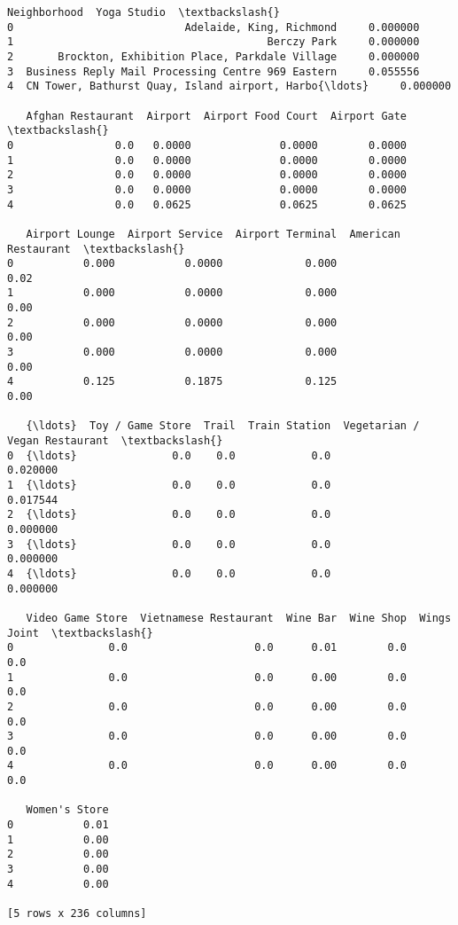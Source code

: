 \documentclass[11pt]{article}
\makeatletter
\newcommand{\boxspacing}{\kern\kvtcb@left@rule\kern\kvtcb@boxsep}
\newcommand{\prompt}[4]{
        \ttfamily\llap{{\color{#2}[#3]:\hspace{3pt}#4}}\vspace{-\baselineskip}
    }
\makeatother
\begin{document}
            \begin{tcolorbox}[breakable, size=fbox, boxrule=.5pt, pad at break*=1mm, opacityfill=0]
\prompt{Out}{outcolor}{40}{\boxspacing}
\begin{Verbatim}[commandchars=\\\{\}]
                                        Neighborhood  Yoga Studio  \textbackslash{}
0                           Adelaide, King, Richmond     0.000000
1                                        Berczy Park     0.000000
2       Brockton, Exhibition Place, Parkdale Village     0.000000
3  Business Reply Mail Processing Centre 969 Eastern     0.055556
4  CN Tower, Bathurst Quay, Island airport, Harbo{\ldots}     0.000000

   Afghan Restaurant  Airport  Airport Food Court  Airport Gate  \textbackslash{}
0                0.0   0.0000              0.0000        0.0000
1                0.0   0.0000              0.0000        0.0000
2                0.0   0.0000              0.0000        0.0000
3                0.0   0.0000              0.0000        0.0000
4                0.0   0.0625              0.0625        0.0625

   Airport Lounge  Airport Service  Airport Terminal  American Restaurant  \textbackslash{}
0           0.000           0.0000             0.000                 0.02
1           0.000           0.0000             0.000                 0.00
2           0.000           0.0000             0.000                 0.00
3           0.000           0.0000             0.000                 0.00
4           0.125           0.1875             0.125                 0.00

   {\ldots}  Toy / Game Store  Trail  Train Station  Vegetarian / Vegan Restaurant  \textbackslash{}
0  {\ldots}               0.0    0.0            0.0                       0.020000
1  {\ldots}               0.0    0.0            0.0                       0.017544
2  {\ldots}               0.0    0.0            0.0                       0.000000
3  {\ldots}               0.0    0.0            0.0                       0.000000
4  {\ldots}               0.0    0.0            0.0                       0.000000

   Video Game Store  Vietnamese Restaurant  Wine Bar  Wine Shop  Wings Joint  \textbackslash{}
0               0.0                    0.0      0.01        0.0          0.0
1               0.0                    0.0      0.00        0.0          0.0
2               0.0                    0.0      0.00        0.0          0.0
3               0.0                    0.0      0.00        0.0          0.0
4               0.0                    0.0      0.00        0.0          0.0

   Women's Store
0           0.01
1           0.00
2           0.00
3           0.00
4           0.00

[5 rows x 236 columns]
\end{Verbatim}
\end{tcolorbox}
        
\end{document}
